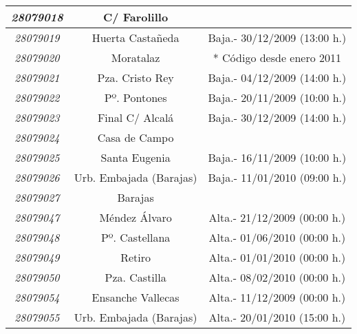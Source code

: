 \begin{table}[H]
\begin{center}
\begin{tabular}{|c|c|c|}
		\textit{28079018}        & C/ Farolillo         &                              \\ \hline
		\textit{28079019}        & Huerta Castañeda     & Baja.- 30/12/2009 (13:00 h.) \\ \hline
		\textit{28079020}        & Moratalaz            & * Código desde enero 2011    \\ \hline
		\textit{28079021}        & Pza. Cristo Rey      & Baja.- 04/12/2009 (14:00 h.) \\ \hline
		\textit{28079022}        & Pº. Pontones         & Baja.- 20/11/2009 (10:00 h.) \\ \hline
		\textit{28079023}        & Final C/ Alcalá      & Baja.- 30/12/2009 (14:00 h.) \\ 	\hline
		\textit{28079024} & Casa de Campo           &                                                                                                  \\ \hline
		\textit{28079025} & Santa Eugenia           & Baja.- 16/11/2009 (10:00 h.)                                                                     \\ \hline
		\textit{28079026} & Urb. Embajada (Barajas) & Baja.- 11/01/2010 (09:00 h.)                                                                     \\ \hline
		\textit{28079027} & Barajas                 &                                                                                                  \\ \hline
		\textit{28079047} & Méndez Álvaro           & Alta.- 21/12/2009 (00:00 h.)                                                                     \\ \hline
		\textit{28079048} & Pº. Castellana          & Alta.- 01/06/2010 (00:00 h.)                                                                     \\ \hline
		\textit{28079049} & Retiro                  & Alta.- 01/01/2010 (00:00 h.)                                                                     \\ \hline
		\textit{28079050} & Pza. Castilla           & Alta.- 08/02/2010 (00:00 h.)                                                                     \\ \hline
		\textit{28079054} & Ensanche Vallecas       & Alta.- 11/12/2009 (00:00 h.)                                                                     \\ \hline
		\textit{28079055} & Urb. Embajada (Barajas) & Alta.- 20/01/2010 (15:00 h.)                                                                     \\ \hline

\end{tabular}
\end{center}
\end{table}
